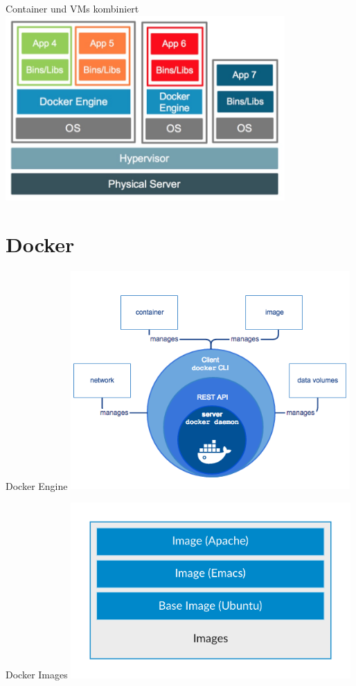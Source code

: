 \documentclass[10pt]{beamer}
\begin{document}
\begin{frame}{Container und VMs kombiniert}
  \center
  \includegraphics[width=0.8\textwidth]{../images/7-container-vm-combined.jpg}
\end{frame}

\section{Docker}

\begin{frame}{Docker Engine}
  \center
  \includegraphics[width=0.8\textwidth]{../images/8-docker-engine.png}
\end{frame}

\begin{frame}{Docker Images}
  \center
  \includegraphics[width=0.8\textwidth]{../images/9-docker-image.png}
\end{frame}
\end{document}
